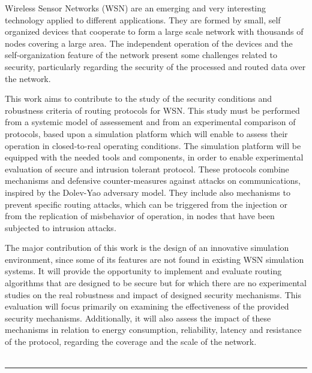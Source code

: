 \abstract
Wireless Sensor Networks (WSN) are an emerging and very interesting technology applied to 
different applications. They are formed by small, self organized devices that cooperate to
form a large scale network with thousands of nodes covering a large area.
The independent operation of the devices and the self-organization feature of the network present
some challenges related to security, particularly regarding the security of the processed and routed
data over the network.  

This work aims to contribute to the study of the security conditions
and robustness criteria of routing protocols  for WSN. This study must be performed from a
systemic model of assessement and from an experimental comparison of
protocols, based upon a simulation platform which will enable to assess their operation in
closed-to-real operating conditions.  The simulation platform will be equipped with the needed tools
and components, in order to enable experimental evaluation of secure and intrusion tolerant
protocol. These protocols combine mechanisms and defensive counter-measures against
attacks on communications, inspired by the Dolev-Yao adversary model. They include also mechanisms
to prevent specific routing attacks, which can be triggered from the injection or from the
replication of misbehavior of operation, in nodes that have been subjected to intrusion attacks. 

The major contribution of this work is the design of an innovative simulation environment, since
some of its features are not found in existing WSN simulation systems. It will provide the
opportunity to implement and evaluate routing
algorithms that are designed to be secure but for which there are no
experimental studies on the real robustness and impact of designed
security mechanisms. This evaluation will focus primarily on examining the effectiveness of the
provided
security mechanisms. Additionally, it will also assess the
impact of these mechanisms in relation to energy consumption, reliability, latency and resistance of
the protocol, regarding the coverage and the scale of the network.
~\\ ~\\ \rule{\textwidth}{0.2mm}
